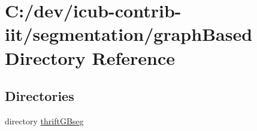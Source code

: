 \section{C\+:/dev/icub-\/contrib-\/iit/segmentation/graph\+Based Directory Reference}
\label{dir_810a9d323a6c62904b9f192dc2ad08ed}
\subsection*{Directories}
\begin{DoxyCompactItemize}
\item 
directory \hyperlink{dir_f5c8695e01d8cc1f0e0e45ab08d0fc9c}{thrift\+G\+Bseg}
\end{DoxyCompactItemize}
